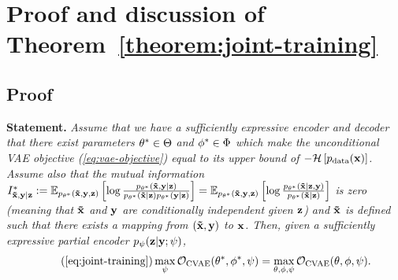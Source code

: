 \section{Proof and discussion of Theorem~\ref{theorem:joint-training}}  \label{proof:joint-training}

\subsection{Proof}

\textbf{Statement.} \textit{Assume that we have a sufficiently expressive
  encoder and decoder that there exist parameters ${\theta}^*\in\Theta$
  and ${\phi}^*\in\Phi$ which make the unconditional VAE objective
  (\cref{eq:vae-objective}) equal to its upper bound of $-\mathcal{H}\left[ p_{\rm{data}}({\mathbf{x}})
  \right]$. Assume also that the mutual information ${I^*_{\mathbf{\tilde{x}}{},\mathbf{y}{}|\mathbf{z}{}}{} :=
  \mathbb{E}_{p_{\theta^*}(\mathbf{\tilde{x}}{}, {\mathbf{y}}, {\mathbf{z}})} \left[ \log
    \frac{p_{\theta^*}(\mathbf{\tilde{x}}{},{\mathbf{y}}|{\mathbf{z}}) }{ p_{\theta^*}(\mathbf{\tilde{x}}{}|{\mathbf{z}})p_{\theta^*}({\mathbf{y}}|{\mathbf{z}}) } \right] =
  \mathbb{E}_{p_{\theta^*}(\mathbf{\tilde{x}}{}, {\mathbf{y}}, {\mathbf{z}})} \left[ \log
    \frac{p_{\theta^*}(\mathbf{\tilde{x}}{}|{\mathbf{z}}, {\mathbf{y}}) }{ p_{\theta^*}(\mathbf{\tilde{x}}{}|{\mathbf{z}}) } \right]}$ is zero (meaning that $\mathbf{\tilde{x}}{}$ and ${\mathbf{y}}$ are
  conditionally independent given ${\mathbf{z}}$) and $\mathbf{\tilde{x}}{}$ is defined such that there
  exists a mapping from $(\mathbf{\tilde{x}}{},{\mathbf{y}})$ to ${\mathbf{x}}$. Then, given a
  sufficiently expressive partial encoder $p_\psi({\mathbf{z}}|{\mathbf{y}}; \psi)$, }
\begin{equation} \tag{\ref{eq:joint-training}}
  \max_{\psi } \gO_\text{CVAE}(\optimal{\theta}, \optimal{\phi}, \psi ) = \max_{\theta, \phi, \psi } \gO_\text{CVAE}(\theta, \phi, \psi ).
\end{equation}

